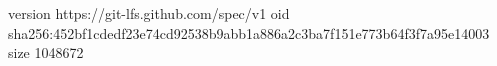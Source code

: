 version https://git-lfs.github.com/spec/v1
oid sha256:452bf1cdedf23e74cd92538b9abb1a886a2c3ba7f151e773b64f3f7a95e14003
size 1048672
